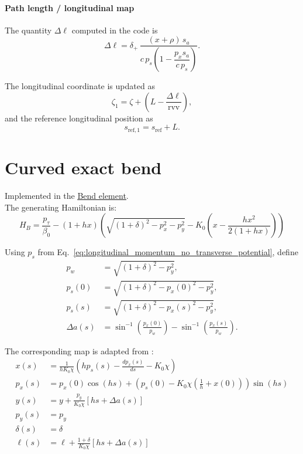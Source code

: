 \paragraph{Path length / longitudinal map}

The quantity \(\Delta \ell\) computed in the code is
\begin{equation}
\Delta \ell
=
\delta_+\,
\frac{(x+\rho)\, s_a}{c\, p_s\left(1-\dfrac{p_x s_a}{c\,p_s}\right)} .
\end{equation}

The longitudinal coordinate is updated as
\begin{equation}
\zeta_1 = \zeta + \left( L - \frac{\Delta \ell}{\mathrm{rvv}} \right),
\end{equation}
and the reference longitudinal position as
\begin{equation}
s_{\text{ref},1} = s_{\text{ref}} + L.
\end{equation}


\section{Curved exact bend}

Implemented in the \href{https://xsuite.readthedocs.io/en/latest/apireference.html#bend}{\underline{Bend element}}.
~\\

The generating Hamiltonian is:
\begin{equation}
H_{B} = \frac{p_\tau}{\beta_0} -(1 + hx) \left( \sqrt{(1 + \delta)^2 - p_x^2 - p_y^2} -K_0\left(x-\frac{hx^2}{2(1+hx)} \right) \right)
\end{equation}

Using $p_s$ from
Eq.~\eqref{eq:longitudinal_momentum_no_transverse_potential}, define
\begin{align}
p_w &= \sqrt{(1+\delta)^2-p_y^2}, \\
p_s(0) &= \sqrt{(1+\delta)^2-p_x(0)^2-p_y^2}, \\
p_s(s) &= \sqrt{(1+\delta)^2-p_x(s)^2-p_y^2}, \\
\Delta a(s) &=
\sin^{-1}\left(\frac{p_x(0)}{p_w}\right)
-\sin^{-1}\left(\frac{p_x(s)}{p_w}\right).
\end{align}

The corresponding map is adapted from \cite{forest99}:
\begin{align}
x(s) &= \frac{1}{hK_0 \chi} \left( h p_s(s) - \frac{dp_x(s)}{ds} - K_0 \chi \right) \\
p_x(s) &= p_x(0) \cos(h s) + \left( p_s(0) - K_0 \chi \left( \frac{1}{h} + x(0) \right) \right) \sin(h s) \\
y(s) &= y + \frac{p_y}{K_0\chi}\left[hs+\Delta a(s)\right] \\
p_y(s) &= p_y \\
\delta(s) &= \delta \\
\ell(s) &= \ell +
  \frac{1+\delta}{K_0\chi}\left[hs+\Delta a(s)\right]
\end{align}

